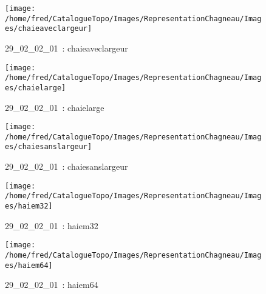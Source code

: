 \documentclass[12pt,titlepage]{book}
\begin{document}
\begin{figure}[h!]
  \hfill         %
  \begin{minipage}[t]{3cm}
    \begin{center}
      \texttt{[image: /home/fred/CatalogueTopo/Images/RepresentationChagneau/Images/chaieaveclargeur]}
      \caption[~29\_02\_02\_01]{\small{29\_02\_02\_01~:} \tiny{chaieaveclargeur}}\label{chaieaveclargeur}
    \end{center}
  \end{minipage}
  \begin{minipage}[t]{3cm}
    \begin{center}
      \texttt{[image: /home/fred/CatalogueTopo/Images/RepresentationChagneau/Images/chaielarge]}
      \caption[~29\_02\_02\_01]{\small{29\_02\_02\_01~:} \tiny{chaielarge}}\label{chaielarge}
    \end{center}
  \end{minipage}
  \begin{minipage}[t]{3cm}
    \begin{center}
      \texttt{[image: /home/fred/CatalogueTopo/Images/RepresentationChagneau/Images/chaiesanslargeur]}
      \caption[~29\_02\_02\_01]{\small{29\_02\_02\_01~:} \tiny{chaiesanslargeur}}\label{chaiesanslargeur}
    \end{center}
  \end{minipage}
  \begin{minipage}[t]{3cm}
    \begin{center}
      \texttt{[image: /home/fred/CatalogueTopo/Images/RepresentationChagneau/Images/haiem32]}
      \caption[~29\_02\_02\_01]{\small{29\_02\_02\_01~:} \tiny{haiem32}}\label{haiem32}
    \end{center}
  \end{minipage}
  \begin{minipage}[t]{3cm}
    \begin{center}
      \texttt{[image: /home/fred/CatalogueTopo/Images/RepresentationChagneau/Images/haiem64]}
      \caption[~29\_02\_02\_01]{\small{29\_02\_02\_01~:} \tiny{haiem64}}\label{haiem64}
    \end{center}
  \end{minipage}
  \begin{minipage}[t]{3cm}

\end{minipage}
\end{figure}
\end{document}
